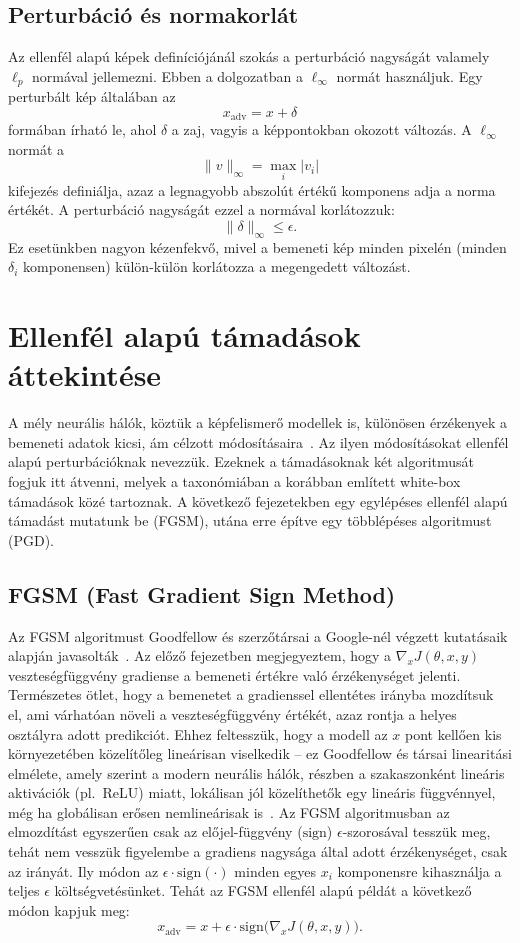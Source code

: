 \subsection{Perturbáció és normakorlát}

Az ellenfél alapú képek definíciójánál szokás a perturbáció nagyságát valamely $\ell_p$ normával jellemezni. 
Ebben a dolgozatban a $\ell_\infty$ normát használjuk. 
Egy perturbált kép általában az 
\[
  x_{\mathrm{adv}} = x + \delta
\]
formában írható le, ahol $\delta$ a zaj, vagyis a képpontokban okozott változás. 
A $\ell_\infty$ normát a 
\[
  \|v\|_\infty = \max_i |v_i|
\]
kifejezés definiálja, azaz a legnagyobb abszolút értékű komponens adja a norma értékét. 
A perturbáció nagyságát ezzel a normával korlátozzuk: 
\[
  \|\delta\|_\infty \leq \epsilon.
\]
Ez esetünkben nagyon kézenfekvő, mivel a bemeneti kép minden pixelén (minden $\delta_i$ komponensen) külön-külön korlátozza a 
megengedett változást. 

\section{Ellenfél alapú támadások áttekintése}
A mély neurális hálók, köztük a képfelismerő modellek is, különösen érzékenyek a bemeneti adatok kicsi, ám célzott 
módosításaira~\cite{goodfellow2015explaining}. 
Az ilyen módosításokat ellenfél alapú perturbációknak nevezzük. 
Ezeknek a támadásoknak két algoritmusát fogjuk itt átvenni, melyek a taxonómiában a korábban említett white-box támadások közé 
tartoznak. 
A következő fejezetekben egy egylépéses ellenfél alapú támadást mutatunk be (FGSM), utána erre építve egy többlépéses 
algoritmust (PGD). 

\subsection{FGSM (Fast Gradient Sign Method)}
Az FGSM algoritmust Goodfellow és szerzőtársai a Google-nél végzett kutatásaik alapján 
javasolták~\cite{goodfellow2015explaining}. 
Az előző fejezetben megjegyeztem, hogy a $\nabla_x J(\theta, x, y)$ veszteségfüggvény gradiense a bemeneti értékre való 
érzékenységet jelenti. 
Természetes ötlet, hogy a bemenetet a gradienssel ellentétes irányba mozdítsuk el, ami várhatóan növeli a veszteségfüggvény 
értékét, azaz rontja a helyes osztályra adott predikciót. 
Ehhez feltesszük, hogy a modell az $x$ pont kellően kis környezetében közelítőleg lineárisan viselkedik -- ez Goodfellow és 
társai linearitási elmélete, amely szerint a modern neurális hálók, részben a szakaszonként lineáris aktivációk (pl.\ ReLU) 
miatt, lokálisan jól közelíthetők egy lineáris függvénnyel, még ha globálisan erősen nemlineárisak 
is~\cite{goodfellow2015explaining}. 
Az FGSM algoritmusban az elmozdítást egyszerűen csak az előjel-függvény ($\mathrm{sign}$) $\epsilon$-szorosával tesszük meg, 
tehát nem vesszük figyelembe a gradiens nagysága által adott érzékenységet, csak az irányát. 
Ily módon az $\epsilon \cdot \mathrm{sign}(\cdot)$ minden egyes $x_i$ komponensre kihasználja a teljes $\epsilon$ 
költségvetésünket. 
Tehát az FGSM ellenfél alapú példát a következő módon kapjuk meg: 
\[
  x_{\mathrm{adv}} = x + \epsilon \cdot \mathrm{sign}\big(\nabla_x J(\theta, x, y)\big).
\]

